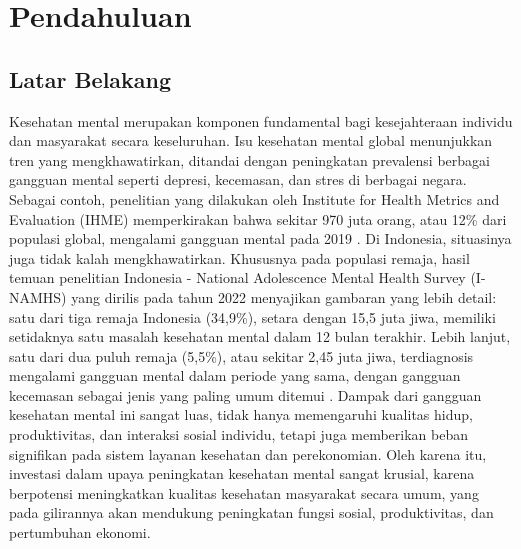 \chapter{Pendahuluan}

\section{Latar Belakang}
Kesehatan mental merupakan komponen fundamental bagi kesejahteraan individu dan masyarakat secara keseluruhan.
Isu kesehatan mental global menunjukkan tren yang mengkhawatirkan, ditandai dengan peningkatan prevalensi berbagai gangguan mental seperti depresi, kecemasan, dan stres di berbagai negara.
Sebagai contoh, penelitian yang dilakukan oleh Institute for Health Metrics and Evaluation (IHME) memperkirakan bahwa sekitar 970 juta orang, atau 12\% dari populasi global, mengalami gangguan mental pada 2019 \cite{GBD2019MentalDisorders}.
Di Indonesia, situasinya juga tidak kalah mengkhawatirkan. Khususnya pada populasi remaja, hasil temuan penelitian Indonesia - National Adolescence Mental Health Survey (I-NAMHS) yang dirilis pada tahun 2022 menyajikan gambaran yang lebih detail:
satu dari tiga remaja Indonesia (34,9\%), setara dengan 15,5 juta jiwa, memiliki setidaknya satu masalah kesehatan mental dalam 12 bulan terakhir.
Lebih lanjut, satu dari dua puluh remaja (5,5\%), atau sekitar 2,45 juta jiwa, terdiagnosis mengalami gangguan mental dalam periode yang sama, dengan gangguan kecemasan sebagai jenis yang paling umum ditemui \cite{INAMHS2022}.
Dampak dari gangguan kesehatan mental ini sangat luas, tidak hanya memengaruhi kualitas hidup, produktivitas, dan interaksi sosial individu, tetapi juga memberikan beban signifikan pada sistem layanan kesehatan dan perekonomian.
Oleh karena itu, investasi dalam upaya peningkatan kesehatan mental sangat krusial, karena berpotensi meningkatkan kualitas kesehatan masyarakat secara umum, yang pada gilirannya akan mendukung peningkatan fungsi sosial, produktivitas, dan pertumbuhan ekonomi.

